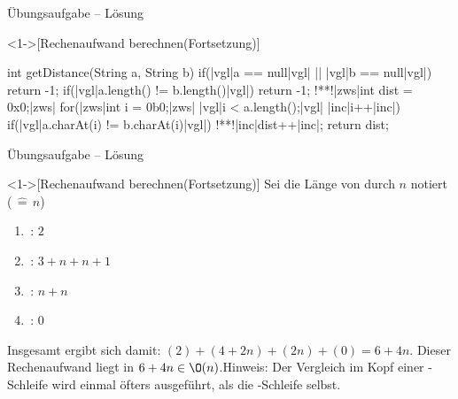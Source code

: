 \begin{frame}[fragile,c]{Übungsaufgabe -- Lösung}
    \addtocounter{solve}{-1}%
    \begin{solve}<1->[Rechenaufwand berechnen\hfill{}(Fortsetzung)]
\begin{plainjava}[language=xJava]
int getDistance(String a, String b){
    if(|vgl|a == null|vgl| || |vgl|b == null|vgl|) return -1;
    if(|vgl|a.length() != b.length()|vgl|) return -1;
    !**!|zws|int dist = 0x0;|zws|
    for(|zws|int i = 0b0;|zws| |vgl|i < a.length();|vgl| |inc|i++|inc|)
        if(|vgl|a.charAt(i) != b.charAt(i)|vgl|)
            !**!|inc|dist++|inc|;
    return dist;
}
\end{plainjava}
    \end{solve}
\end{frame}


\begin{frame}[c]{Übungsaufgabe -- Lösung}
    \addtocounter{solve}{-1}%
    \begin{solve}<1->[Rechenaufwand berechnen\hfill{}(Fortsetzung)]
        \pause{}Sei die Länge von  durch \(n\) notiert (\(\,\widehat{=}\, n\))
\begin{multicols}{2}
    \begin{enumerate}[<+(1)->]
        \item {}\,: \(2\)
        \item {}\,: \(3 + n + n + 1\)
        \item {}\,: \(n+n\)
        \item {}\,: \(0\)
    \end{enumerate}
\end{multicols}
    \pause{}Insgesamt ergibt sich damit: \((2) + (4 + 2n) + (2n) + (0) = 6 + 4n\).\pause{} Dieser Rechenaufwand liegt in \(6 + 4n \in \O(n)\).\smallskip\newline\pause{}Hinweis:\pause{} Der Vergleich im Kopf einer -Schleife wird einmal öfters ausgeführt,\pause{} als die -Schleife selbst.
    \end{solve}
\end{frame}

